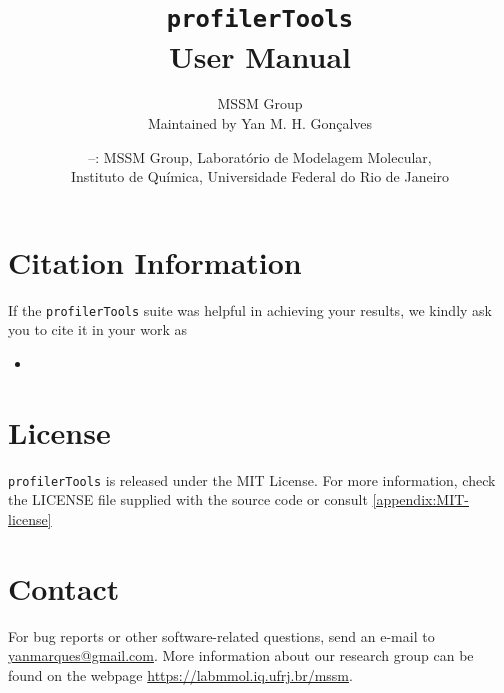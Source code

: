 \documentclass[10pt,a4paper,openany]{memoir}
\title{\Huge\texttt{profilerTools} \\ User Manual}
\author{{\huge MSSM Group} \\ Maintained by Yan M. H. Gonçalves}
\date{\footnotesize\textcopyright 2020--: \hspace{5ex}
  MSSM Group, Laboratório de Modelagem Molecular,\\
  \hspace{16ex} Instituto de Química, Universidade Federal do Rio de Janeiro}
\numberwithin{equation}{section}
\newcommand{\profilertools}[0]{\texttt{profilerTools}}
\begin{document}
  \maketitle
  \thispagestyle{empty}

  \clearpage
  \frontmatter
  \nouppercaseheads
  \addtolength{\headheight}{2ex}
  \addtolength{\headsep}{-2ex}

  \section{Citation Information}





  If the \profilertools{} suite was helpful in
  achieving your results, we kindly ask you to cite it in your work as

  \begin{itemize}
    \item {}
  \end{itemize}


  \section{License}

  \profilertools{} is released under the MIT License. For more
  information, check the LICENSE file supplied with the source code or
  consult \autoref{appendix:MIT-license}

  \section{Contact}

  For bug reports or other software-related questions, send an e-mail
  to \url{yanmarques@gmail.com}.  More information about our research
  group can be found on the webpage
  \url{https://labmmol.iq.ufrj.br/mssm}.
\end{document}
